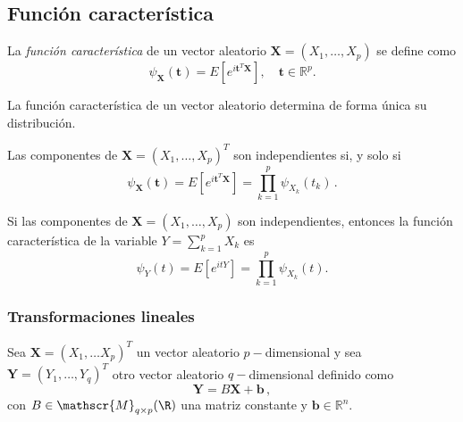 \subsection{Función característica}

\begin{ndef}
    La \emph{función característica} de un vector aleatorio \(\boldsymbol X = (X_1,\dots,X_p)\) se define como \[\psi_{\boldsymbol X}(\boldsymbol t)=E\left[e^{i\boldsymbol t^T\boldsymbol X}\right], \quad \boldsymbol t\in \mathbb{R}^p.\]
\end{ndef}

\begin{nth}[Unicidad]
  La función característica de un vector aleatorio determina de forma única su distribución.
\end{nth}

\begin{nprop}
  Las componentes de \(\boldsymbol X=(X_1,\dots,X_p)^T\) son independientes si, y solo si \[\psi_{\boldsymbol X}(\boldsymbol t)=E\left[e^{i\boldsymbol t^T\boldsymbol X}\right] = \prod_{k=1}^p\psi_{X_k}(t_k)\,.\]
\end{nprop}

\begin{nprop}
  Si las componentes de \(\boldsymbol X=(X_1,\dots, X_p)\) son independientes, entonces la función característica de la variable \(Y=\sum_{k=1}^p X_k\) es \[\psi_{Y}(t)=E\left[e^{itY}\right] = \prod_{k=1}^p\psi_{X_k}(t).\]
\end{nprop}

\subsubsection{Transformaciones lineales}

Sea $\boldsymbol X = (X_1, \dots X_p)^T$ un vector aleatorio $p-$dimensional y sea $\boldsymbol Y = (Y_1,\dots,Y_q)^T$ otro vector aleatorio $q-$dimensional definido como
\[
  \boldsymbol Y = B\boldsymbol X + \boldsymbol b\,,
\]
con $B \in \mathscr{M}_{q\times p}(\R)$ una matriz constante y $\boldsymbol b\in \mathbb R ^n$.

